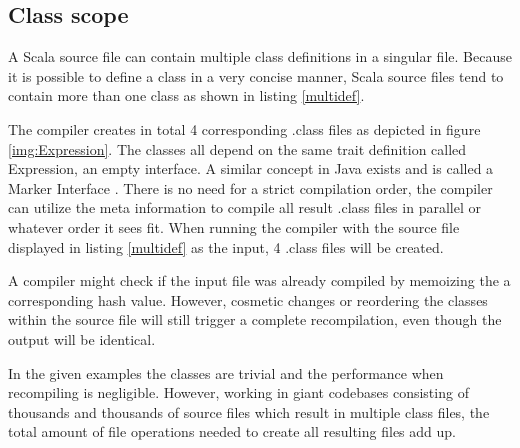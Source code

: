 \documentclass{VUMIFPSbakalaurinis}
\begin{document}
\subsection{Class scope}

A Scala source file can contain multiple class definitions in a singular file.
Because it is possible to define a class in a very concise manner, Scala source files tend to contain more than one class as shown in listing \ref{multidef}.




The compiler creates in total 4 corresponding .class files as depicted in figure \ref{img:Expression}.
The classes all depend on the same trait definition called Expression, an empty interface.
A similar concept in Java exists and is called a Marker Interface \cite{10.5555/1407381}.
There is no need for a strict compilation order, the compiler can utilize the meta information to compile all result .class files in parallel or whatever order it sees fit.
When running the compiler with the source file displayed in listing \ref{multidef} as the input, 4 .class files will be created.

A compiler might check if the input file was already compiled by memoizing the a corresponding hash value.
However, cosmetic changes or reordering the classes within the source file will still trigger a complete recompilation, even though the output will be identical.

In the given examples the classes are trivial and the performance when recompiling is negligible.
However, working in giant codebases consisting of thousands and thousands of source files which result in multiple class files, the total amount of file operations needed to create all resulting files add up.
\end{document}
